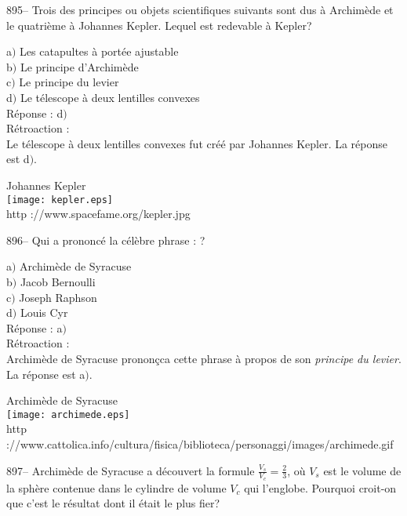 ﻿\documentclass[letterpaper, 12pt]{article}
\begin{document}
895-- Trois des principes ou objets scientifiques suivants sont dus
\`a Archim\`ede et le quatri\`eme \`a Johannes Kepler. Lequel est
redevable \`a Kepler?

a$)$ Les catapultes \`a port\'ee ajustable\\
b$)$ Le principe d'Archim\`ede \\
c$)$ Le principe du levier \\
d$)$ Le t\'elescope \`a deux lentilles convexes \\

R\'eponse : d$)$\\

R\'etroaction : \\
Le t\'elescope \`a deux lentilles convexes fut cr\'e\'e par
Johannes Kepler. La r\'eponse est d$)$.\\

        \begin{center}
        Johannes Kepler\\
    \texttt{[image: kepler.eps]}\\
        {\footnotesize http ://www.spacefame.org/kepler.jpg}
    \end{center}

896-- Qui a prononc\'e la c\'el\`ebre phrase : \fg ?

a$)$ Archim\`ede de Syracuse\\
b$)$ Jacob Bernoulli \\
c$)$ Joseph Raphson \\
d$)$ Louis Cyr \\

R\'eponse : a$)$\\

R\'etroaction : \\
Archim\`ede de Syracuse pronon\c cca cette phrase \`a propos de son {\sl
principe du levier}. La r\'eponse est a$)$.\\

        \begin{center}
        Archim\`ede de Syracuse\\
    \texttt{[image: archimede.eps]}\\
        {\footnotesize http
://www.cattolica.info/cultura/fisica/biblioteca/personaggi/images/archimede.gif}
    \end{center}

897-- Archim\`ede de Syracuse a d\'ecouvert la formule
$\frac{V_s}{V_c}=\frac23$, o\`u $V_s$ est le volume de la sph\`ere
contenue dans le cylindre de volume $V_c$ qui l'englobe. Pourquoi
croit-on que c'est le r\'esultat dont il \'etait le plus fier?
\end{document}
